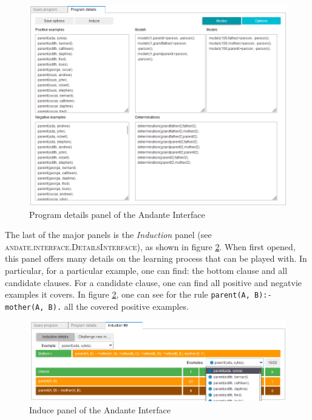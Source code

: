 \documentclass{article}
\begin{document}
\begin{figure}[h!]
    \includegraphics[width = \textwidth]{images/Interface - details.PNG}
    \caption{Program details panel of the Andante Interface}
    \label{fig:interface:detailspanel}
\end{figure}

The last of the major panels is the \textit{Induction} panel (see
\textsc{andate.interface.DetailsInterface}), as shown in figure
\ref{fig:interface:inducepanel}. When first opened, this panel offers many
details on the learning process that can be played with. In particular, for a
particular example, one can find: the bottom clause and all candidate clauses.
For a candidate clause, one can find all positive and negatvie examples it
covers. In figure \ref{fig:interface:inducepanel}, one can see for the rule
\Verb#parent(A, B):- mother(A, B).# all the covered positive examples.

\begin{figure}[h!]
    \includegraphics[width = \textwidth]{images/Interface - induction - examples.PNG}
    \caption{Induce panel of the Andante Interface}
    \label{fig:interface:inducepanel}
\end{figure}
\end{document}
